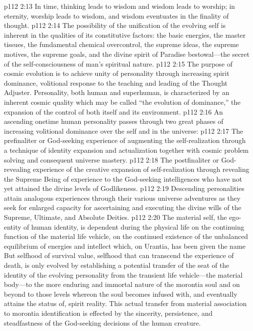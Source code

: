 \vs p112 2:13 In time, thinking leads to wisdom and wisdom leads to worship; in eternity, worship leads to wisdom, and wisdom eventuates in the finality of thought.
\vs p112 2:14 The possibility of the unification of the evolving self is inherent in the qualities of its constitutive factors: the basic energies, the master tissues, the fundamental chemical overcontrol, the supreme ideas, the supreme motives, the supreme goals, and the divine spirit of Paradise bestowal---the secret of the self\hyp{}consciousness of man’s spiritual nature.
\vs p112 2:15 The purpose of cosmic evolution is to achieve unity of personality through increasing spirit dominance, volitional response to the teaching and leading of the Thought Adjuster. Personality, both human and superhuman, is characterized by an inherent cosmic quality which may be called “the evolution of dominance,” the expansion of the control of both itself and its environment.
\pc \vs p112 2:16 An ascending onetime human personality passes through two great phases of increasing volitional dominance over the self and in the universe:
\pc \vs p112 2:17 \bibnobreakspace The prefinaliter or God\hyp{}seeking experience of augmenting the self\hyp{}realization through a technique of identity expansion and actualization together with cosmic problem solving and consequent universe mastery.
\vs p112 2:18 \bibnobreakspace The postfinaliter or God\hyp{}revealing experience of the creative expansion of self\hyp{}realization through revealing the Supreme Being of experience to the God\hyp{}seeking intelligences who have not yet attained the divine levels of Godlikeness.
\pc \vs p112 2:19 Descending personalities attain analogous experiences through their various universe adventures as they seek for enlarged capacity for ascertaining and executing the divine wills of the Supreme, Ultimate, and Absolute Deities.
\pc \vs p112 2:20 The material self, the ego\hyp{}entity of human identity, is dependent during the physical life on the continuing function of the material life vehicle, on the continued existence of the unbalanced equilibrium of energies and intellect which, on Urantia, has been given the name  But selfhood of survival value, selfhood that can transcend the experience of death, is only evolved by establishing a potential transfer of the seat of the identity of the evolving personality from the transient life vehicle---the material body---to the more enduring and immortal nature of the morontia soul and on beyond to those levels whereon the soul becomes infused with, and eventually attains the status of, spirit reality. This actual transfer from material association to morontia identification is effected by the sincerity, persistence, and steadfastness of the God\hyp{}seeking decisions of the human creature.

